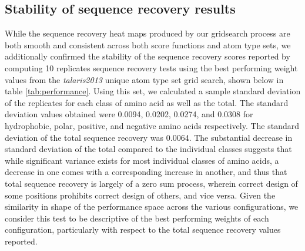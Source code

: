 \subsection{Stability of sequence recovery results}
While the sequence recovery heat maps produced by our gridsearch process are both smooth and consistent across both score functions and atom type sets, we additionally confirmed the stability of the sequence recovery scores reported by computing 10 replicates sequence recovery tests using the best performing weight values from the \textit{talaris2013} unique atom type set grid search, shown below in table \ref{tab:performance}.
Using this set, we calculated a sample standard deviation of the replicates for each class of amino acid as well as the total.
The standard deviation values obtained were 0.0094, 0.0202, 0.0274, and 0.0308 for hydrophobic, polar, positive, and negative amino acids respectively.
The standard deviation of the total sequence recovery was 0.0064.
The substantial decrease in standard deviation of the total compared to the individual classes suggests that while significant variance exists for most individual classes of amino acids, a decrease in one comes with a corresponding increase in another, and thus that total sequence recovery is largely of a zero sum process, wherein correct design of some positions prohibits correct design of others, and vice versa.
Given the similarity in shape of the performance space across the various configurations, we consider this test to be descriptive of the best performing weights of each configuration, particularly with respect to the total sequence recovery values reported.


